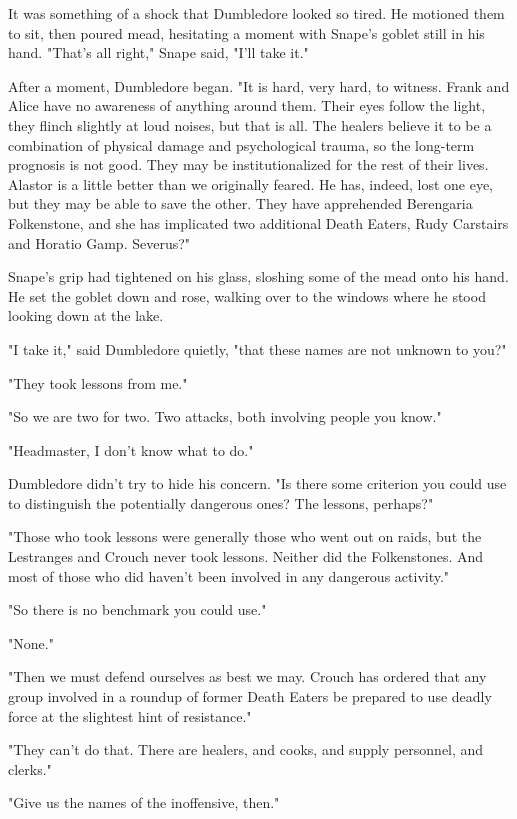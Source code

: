 It was something of a shock that Dumbledore looked so tired. He motioned them to sit, then poured mead, hesitating a moment with Snape's goblet still in his hand. "That's all right," Snape said, "I'll take it."

After a moment, Dumbledore began. "It is hard, very hard, to witness. Frank and Alice have no awareness of anything around them. Their eyes follow the light, they flinch slightly at loud noises, but that is all. The healers believe it to be a combination of physical damage and psychological trauma, so the long-term prognosis is not good. They may be institutionalized for the rest of their lives. Alastor is a little better than we originally feared. He has, indeed, lost one eye, but they may be able to save the other. They have apprehended Berengaria Folkenstone, and she has implicated two additional Death Eaters, Rudy Carstairs and Horatio Gamp. Severus?"

Snape's grip had tightened on his glass, sloshing some of the mead onto his hand. He set the goblet down and rose, walking over to the windows where he stood looking down at the lake.

"I take it," said Dumbledore quietly, "that these names are not unknown to you?"

"They took lessons from me."

"So we are two for two. Two attacks, both involving people you know."

"Headmaster, I don't know what to do."

Dumbledore didn't try to hide his concern. "Is there some criterion you could use to distinguish the potentially dangerous ones? The lessons, perhaps?"

"Those who took lessons were generally those who went out on raids, but the Lestranges and Crouch never took lessons. Neither did the Folkenstones. And most of those who did haven't been involved in any dangerous activity."

"So there is no benchmark you could use."

"None."

"Then we must defend ourselves as best we may. Crouch has ordered that any group involved in a roundup of former Death Eaters be prepared to use deadly force at the slightest hint of resistance."

"They can't do that. There are healers, and cooks, and supply personnel, and clerks."

"Give us the names of the inoffensive, then."

